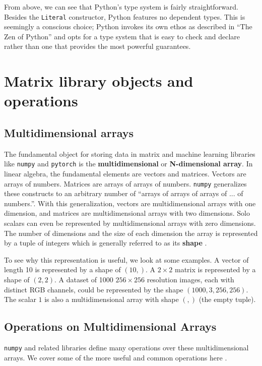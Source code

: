 \documentclass{report}
\begin{document}
From above, we can see that Python's type system is fairly straightforward. Besides the \texttt{Literal} constructor, Python features no dependent types. This is seemingly a conscious choice; Python invokes its own ethos as described in ``The Zen of Python'' and opts for a type system that is easy to check and declare rather than one that provides the most powerful guarantees.

\section{Matrix library objects and operations}

\subsection{Multidimensional arrays}
\label{multidimensional}

The fundamental object for storing data in matrix and machine learning libraries like \texttt{numpy} and \texttt{pytorch} is the \textbf{multidimensional} or \textbf{N-dimensional array}. In linear algebra, the fundamental elements are vectors and matrices. Vectors are arrays of numbers. Matrices are arrays of arrays of numbers. \texttt{numpy} generalizes these constructs to an arbitrary number of ``arrays of arrays of arrays of ... of numbers.''. With this generalization, vectors are multidimensional arrays with one dimension, and matrices are multidimensional arrays with two dimensions. Solo scalars can even be represented by multidimensional arrays with zero dimensions. The number of dimensions and the size of each dimension the array is represented by a tuple of integers which is generally referred to as its \textbf{shape} \cite{ndarray}.

To see why this representation is useful, we look at some examples. A vector of length 10 is represented by a shape of $(10,)$. A $2 \times 2$ matrix is represented by a shape of $(2, 2)$. A dataset of 1000 $256 \times 256$ resolution images, each with distinct RGB channels, could be represented by the shape $(1000, 3, 256, 256)$. The scalar $1$ is also a multidimensional array with shape $(,)$ (the empty tuple).

\subsection{Operations on Multidimensional Arrays}
\label{ndarray-operations}

\texttt{numpy} and related libraries define many operations over these multidimensional arrays. We cover some of the more useful and common operations here \cite{numpy-manual}.
\end{document}
